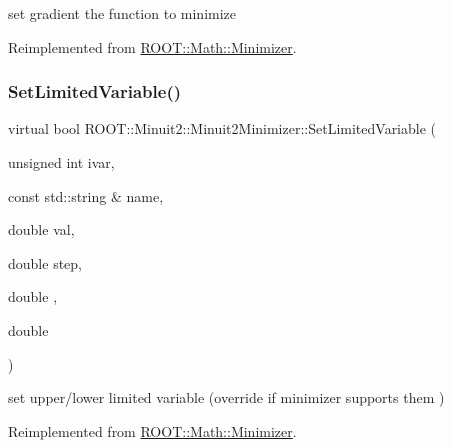 set gradient the function to minimize 



Reimplemented from \mbox{\hyperlink{classROOT_1_1Math_1_1Minimizer_a1d9ff15aa732e518a60a05dcbd82c34a}{R\+O\+O\+T\+::\+Math\+::\+Minimizer}}.

\mbox{\label{classROOT_1_1Minuit2_1_1Minuit2Minimizer_a30385295df6a6b784aa59de7f00e4d23}} 
\subsubsection{\texorpdfstring{SetLimitedVariable()}{SetLimitedVariable()}\hspace{0.1cm}{\footnotesize\ttfamily [1/3]}}
{\footnotesize\ttfamily virtual bool R\+O\+O\+T\+::\+Minuit2\+::\+Minuit2\+Minimizer\+::\+Set\+Limited\+Variable (\begin{DoxyParamCaption}\item[{unsigned int}]{ivar,  }\item[{const std\+::string \&}]{name,  }\item[{double}]{val,  }\item[{double}]{step,  }\item[{double}]{,  }\item[{double}]{ }\end{DoxyParamCaption})\hspace{0.3cm}{\ttfamily [virtual]}}



set upper/lower limited variable (override if minimizer supports them ) 



Reimplemented from \mbox{\hyperlink{classROOT_1_1Math_1_1Minimizer_a4303530cbb62ceb7cf9c9ebcbde530c2}{R\+O\+O\+T\+::\+Math\+::\+Minimizer}}.

\mbox{\label{classROOT_1_1Minuit2_1_1Minuit2Minimizer_a30385295df6a6b784aa59de7f00e4d23}} 

